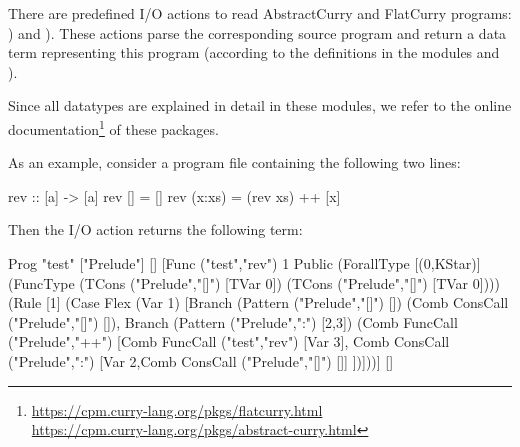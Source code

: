 {There are predefined I/O actions to read AbstractCurry and
FlatCurry programs: )
and ).
These actions parse the corresponding source program and return
a data term representing this program (according to the definitions
in the modules  and ).

Since all datatypes are explained in detail in these modules,
we refer to the online documentation\footnote{%
\url{https://cpm.curry-lang.org/pkgs/flatcurry.html}\\
\url{https://cpm.curry-lang.org/pkgs/abstract-curry.html}}
of these packages.

As an example, consider a program file 
containing the following two lines:
\begin{curry}
rev :: [a] -> [a]
rev []     = []
rev (x:xs) = (rev xs) ++ [x]
\end{curry}
Then the I/O action  returns the
following term:
\begin{curry}
Prog "test"
  ["Prelude"]
  []
  [Func ("test","rev") 1 Public
    (ForallType [(0,KStar)] (FuncType (TCons ("Prelude","[]") [TVar 0])
                                      (TCons ("Prelude","[]") [TVar 0])))
    (Rule [1]
       (Case Flex (Var 1)
          [Branch (Pattern ("Prelude","[]") [])
             (Comb ConsCall ("Prelude","[]") []),
           Branch (Pattern ("Prelude",":") [2,3])
             (Comb FuncCall ("Prelude","++")
                   [Comb FuncCall ("test","rev") [Var 3],
                    Comb ConsCall ("Prelude",":")
                         [Var 2,Comb ConsCall ("Prelude","[]") []]
                   ])]))]
  []
\end{curry}


\newpage


}
